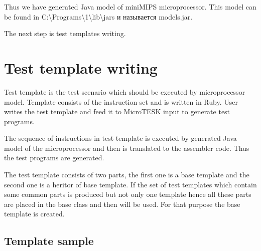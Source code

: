 \documentclass[oneside,final,12pt]{extreport}
\begin{document}
\bigskip

Thus we have generated Java model of miniMIPS microprocessor. This model can be found in C:\textbackslash{Programs}\textbackslash{1}\textbackslash{lib}\textbackslash{jars} и называется models.jar.

\bigskip

The next step is test templates writing.

\bigskip

\newpage


\section*{Test template writing}



\bigskip


Test template is the test scenario which should be executed by microprocessor model. Template consists of the instruction set and is written in Ruby. User writes the test template and feed it to MicroTESK input to generate test programs. 


\bigskip


The sequence of instructions in test template is executed by generated Java model of the microprocessor and then is translated to the assembler code. Thus the test programs are generated.


\bigskip

The test template consists of two parts, the first one is a base template and the second one is a heritor of base template. If the set of test templates which contain some common parts is produced but not only one template hence all these parts are placed in the base class and then will be used. For that purpose the base template is created.

\bigskip

\bigskip

\subsection*{Template sample}
\end{document}
